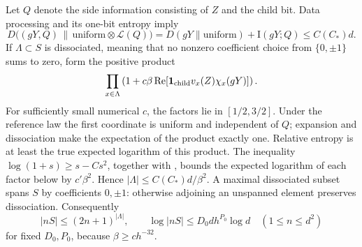 Let $Q$ denote the side information consisting of $Z$ and the child
bit.  Data processing and its one-bit entropy imply
\[
 D\bigl((gY,Q)\,\|\,\text{uniform}\otimes\mathcal L(Q)\bigr)
 =D(gY\|\text{uniform})+\mathrm I(gY;Q)\le C(C_*)d.
\]
If $\Lambda\subset S$ is dissociated, meaning that no nonzero
coefficient choice from $\{0,\pm1\}$ sums to zero, form the positive
product
\[
 \prod_{x\in\Lambda}
 \left(1+c\beta\operatorname{Re}
       [\mathbf1_{\rm child}v_x(Z)\chi_x(gY)]\right).
\]
For sufficiently small numerical $c$, the factors lie in $[1/2,3/2]$.
Under the reference law the first coordinate is uniform and independent
of $Q$; expansion and dissociation make the expectation of the product
exactly one.  Relative entropy is at least the true expected logarithm
of this product.  The inequality $\log(1+s)\ge s-Cs^2$, together with
, bounds the expected logarithm of each factor below
by $c'\beta^2$.  Hence $|\Lambda|\le C(C_*)d/\beta^2$.
A maximal dissociated subset spans $S$ by coefficients $0,\pm1$:
otherwise adjoining an unspanned element preserves dissociation.
Consequently
\[
 |nS|\le(2n+1)^{|\Lambda|},\qquad
 \log|nS|\le D_0d h^{P_0}\log d\quad(1\le n\le d^2)
\]
for fixed $D_0,P_0$, because $\beta\ge c h^{-32}$.

